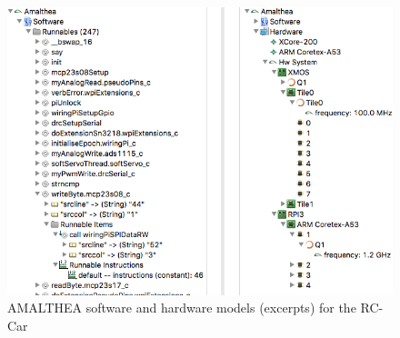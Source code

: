 \documentclass [a4paper,final,conference,10pt]{IDAACS}
\begin{document}
\begin{figure}[bth]
	\centering
	\includegraphics[scale=0.34]{images/models.png}
	\caption{\label{fig:model}AMALTHEA software and hardware models (excerpts) for the RC-Car}
\end{figure}
\end{document}
